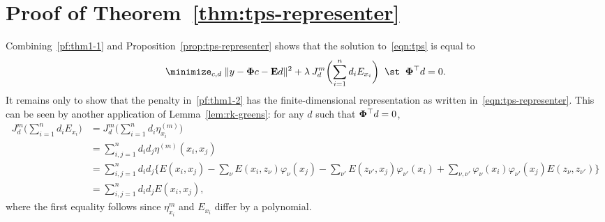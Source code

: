 \documentclass{article}
\newcommand{\1}{\mathbf{1}}
\begin{document}
\section{Proof of Theorem~\ref{thm:tps-representer}}
Combining~\eqref{pf:thm1-1} and Proposition~\ref{prop:tps-representer} shows that the solution to~\eqref{eqn:tps} is equal to
\begin{equation}
\label{pf:thm1-2}
\minimize_{c,d} \; \|y - {\bf \Phi} c - {\bf E} d\|^2 + \lambda \hspace{2 pt} J_d^m\biggl(\sum_{i = 1}^{n} d_i E_{x_i}\biggr) \;\; \st \;\; {\bf \Phi}^{\top}d = 0.
\end{equation}
It remains only to show that the penalty in~\eqref{pf:thm1-2} has the finite-dimensional representation as written in~\eqref{eqn:tps-representer}. This can be seen by another application of Lemma~\ref{lem:rk-greens}: for any $d$ such that ${\bf \Phi}^{\top} d = 0$,
\begin{align*}
J_d^m\biggl(\sum_{i = 1}^{n} d_i E_{x_i}\biggr) & = J_d^m\biggl(\sum_{i = 1}^{n} d_i \eta_{x_i}^{(m)}\biggr) \\
& = \sum_{i,j = 1}^{n} d_i d_j \eta^{(m)}(x_i,x_j) \\
& = \sum_{i,j = 1}^{n} d_i d_j \biggl\{E(x_i,x_j) -  \sum_{\nu} E(x_i,z_{\nu}) \varphi_{\nu}(x_j) - \sum_{\nu'} E(z_{\nu'},x_j) \varphi_{\nu'}(x_i) + \sum_{\nu,\nu'} \varphi_{\nu}(x_i) \varphi_{\nu'}(x_j) E(z_{\nu},z_{\nu'}) \biggr\} \\
& = \sum_{i,j = 1}^{n} d_i d_j E(x_i,x_j),
\end{align*}
where the first equality follows since $\eta_{x_i}^{m}$ and $E_{x_i}$ differ by a polynomial.


 
\end{document}
